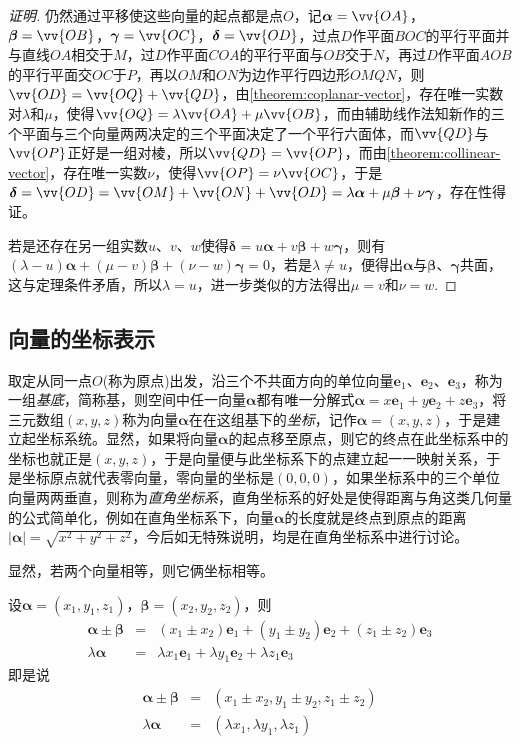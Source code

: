 \begin{proof}[证明]
  仍然通过平移使这些向量的起点都是点$O$，记$\bm{\alpha}=\vv{OA}$，$\bm{\beta}=\vv{OB}$，$\bm{\gamma}=\vv{OC}$，$\bm{\delta}=\vv{OD}$，过点$D$作平面$BOC$的平行平面并与直线$OA$相交于$M$，过$D$作平面$COA$的平行平面与$OB$交于$N$，再过$D$作平面$AOB$的平行平面交$OC$于$P$，再以$OM$和$ON$为边作平行四边形$OMQN$，则$\vv{OD}=\vv{OQ}+\vv{QD}$，由\autoref{theorem:coplanar-vector}，存在唯一实数对$\lambda$和$\mu$，使得$\vv{OQ}=\lambda \vv{OA} + \mu \vv{OB}$，而由辅助线作法知新作的三个平面与三个向量两两决定的三个平面决定了一个平行六面体，而$\vv{QD}$与$\vv{OP}$正好是一组对棱，所以$\vv{QD}=\vv{OP}$，而由\autoref{theorem:collinear-vector}，存在唯一实数$\nu$，使得$\vv{OP}=\nu \vv{OC}$，于是$\bm{\delta} = \vv{OD} = \vv{OM}+\vv{ON}+\vv{OD}=\lambda \bm{\alpha} + \mu \bm{\beta} + \nu \bm{\gamma}$，存在性得证。

  若是还存在另一组实数$u$、$v$、$w$使得$\bm{\delta} = u \bm{\alpha} + v \bm{\beta} + w \bm{\gamma}$，则有$(\lambda-u)\bm{\alpha}+(\mu-v)\bm{\beta}+(\nu-w)\bm{\gamma}=0$，若是$\lambda \neq u$，便得出$\bm{\alpha}$与$\bm{\beta}$、$\bm{\gamma}$共面，这与定理条件矛盾，所以$\lambda = u$，进一步类似的方法得出$\mu =v$和$\nu=w$.
\end{proof}


\subsection{向量的坐标表示}
\label{sec:codrnation-of-vector}

取定从同一点$O$(称为原点)出发，沿三个不共面方向的单位向量$\bm{e}_1$、$\bm{e}_2$、$\bm{e}_3$，称为一组\emph{基底}，简称基，则空间中任一向量$\bm{\alpha}$都有唯一分解式$\bm{\alpha}=x\bm{e}_1+y\bm{e}_2+z\bm{e}_3$，将三元数组$(x,y,z)$称为向量$\bm{\alpha}$在在这组基下的\emph{坐标}，记作$\bm{\alpha}=(x,y,z)$，于是建立起坐标系统。显然，如果将向量$\bm{\alpha}$的起点移至原点，则它的终点在此坐标系中的坐标也就正是$(x,y,z)$，于是向量便与此坐标系下的点建立起一一映射关系，于是坐标原点就代表零向量，零向量的坐标是$(0,0,0)$，如果坐标系中的三个单位向量两两垂直，则称为\emph{直角坐标系}，直角坐标系的好处是使得距离与角这类几何量的公式简单化，例如在直角坐标系下，向量$\bm{\alpha}$的长度就是终点到原点的距离$|\bm{\alpha}| = \sqrt{x^2+y^2+z^2}$，今后如无特殊说明，均是在直角坐标系中进行讨论。

显然，若两个向量相等，则它俩坐标相等。

设$\bm{\alpha}=(x_1,y_1,z_1)$，$\bm{\beta}=(x_2,y_2,z_2)$，则
\begin{eqnarray*}
  \bm{\alpha} \pm \bm{\beta} & = & (x_1 \pm x_2)\bm{e}_1+(y_1 \pm y_2)\bm{e}_2 + (z_1 \pm z_2) \bm{e}_3 \\
  \lambda \bm{\alpha} & = & \lambda x_1 \bm{e}_1 + \lambda y_1 \bm{e}_2 + \lambda z_1 \bm{e}_3
\end{eqnarray*}
即是说
\begin{eqnarray*}
  \bm{\alpha} \pm \bm{\beta} & = & (x_1 \pm x_2, y_1 \pm y_2, z_1 \pm z_2) \\
  \lambda \bm{\alpha} & = & (\lambda x_1, \lambda y_1, \lambda z_1)
\end{eqnarray*}

